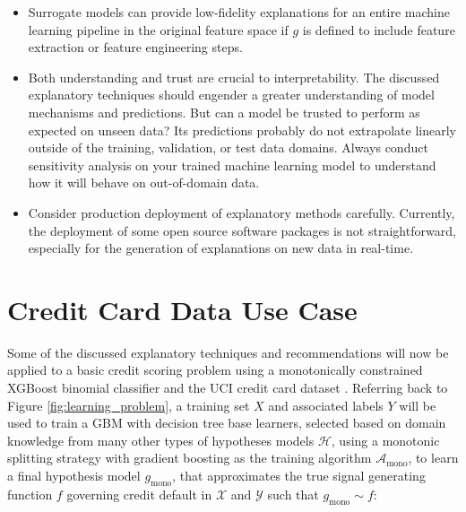 \documentclass[sigconf, review]{acmart}
\begin{document}
\begin{itemize}
	\item Surrogate models can provide low-fidelity explanations for an entire machine learning pipeline in the original feature space if $g$ is defined to include feature extraction or feature engineering steps.\\
	
	\item Both understanding and trust are crucial to interpretability. The discussed explanatory techniques should engender a greater understanding of model mechanisms and predictions. But can a model be trusted to perform as expected on unseen data? Its predictions probably do not extrapolate linearly outside of the training, validation, or test data domains. Always conduct sensitivity analysis on your trained machine learning model to understand how it will behave on out-of-domain data.\\
	
	\item Consider production deployment of explanatory methods carefully. Currently, the deployment of some open source software packages is not straightforward, especially for the generation of explanations on new data in real-time.\\
	
\end{itemize}

\section{Credit Card Data Use Case} \label{sec:use_case}

Some of the discussed explanatory techniques and recommendations will now be applied to a basic credit scoring problem using a monotonically constrained XGBoost binomial classifier and the UCI credit card dataset \cite{uci}. Referring back to Figure \ref{fig:learning_problem}, a training set $X$ and associated labels $Y$ will be used to train a GBM with decision tree base learners, selected based on domain knowledge from many other types of hypotheses models $\mathcal{H}$, using a monotonic splitting strategy with gradient boosting as the training algorithm $\mathcal{A}_{\text{mono}}$, to learn a final hypothesis model $g_{\text{mono}}$, that approximates the true signal generating function $f$ governing credit default in $\mathcal{X}$ and $\mathcal{Y}$ such that $g_{\text{mono}} \sim f$:
\end{document}
